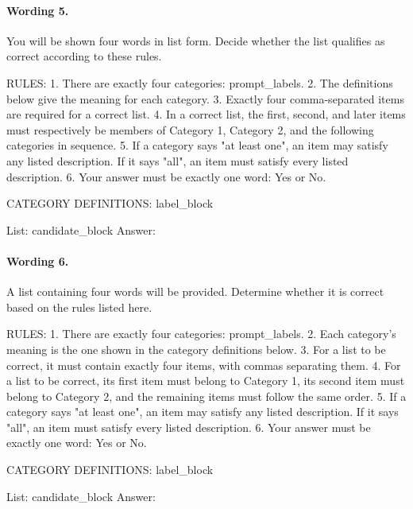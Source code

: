 \paragraph{Wording 5.}
\begin{promptbox}
You will be shown four words in list form. Decide whether the list qualifies as correct according to these rules.

RULES:
1. There are exactly four categories: {prompt_labels}.
2. The definitions below give the meaning for each category.
3. Exactly four comma-separated items are required for a correct list.
4. In a correct list, the first, second, and later items must respectively be members of Category 1, Category 2, and the following categories in sequence.
5. If a category says "at least one", an item may satisfy any listed description. If it says "all", an item must satisfy every listed description.
6. Your answer must be exactly one word: Yes or No.

CATEGORY DEFINITIONS:
{label_block}

List: {candidate_block}
Answer:
\end{promptbox}

\paragraph{Wording 6.}
\begin{promptbox}
A list containing four words will be provided. Determine whether it is correct based on the rules listed here.

RULES:
1. There are exactly four categories: {prompt_labels}.
2. Each category's meaning is the one shown in the category definitions below.
3. For a list to be correct, it must contain exactly four items, with commas separating them.
4. For a list to be correct, its first item must belong to Category 1, its second item must belong to Category 2, and the remaining items must follow the same order.
5. If a category says "at least one", an item may satisfy any listed description. If it says "all", an item must satisfy every listed description.
6. Your answer must be exactly one word: Yes or No.

CATEGORY DEFINITIONS:
{label_block}

List: {candidate_block}
Answer:
\end{promptbox}
